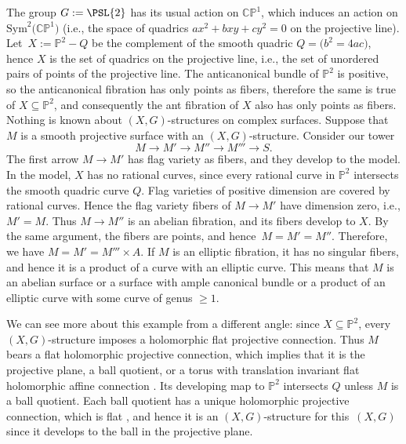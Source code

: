 \documentclass[10pt,a4paper]{amsart}
\providecommand{\Proj}{}
\numberwithin{equation}{section}
\renewcommand{\Proj}[1]{{\mathbb{P}^{#1}}}
\begin{document}
\begin{Example}
The group $G := \PSL{2}$ has its usual action on ${\mathbb C}{\mathbb P}^1$, which induces an action on $\text{Sym}^2\big({\mathbb C}{\mathbb P}^1\big)$
(i.e., the space of quadrics $ax^2+bxy+cy^2 = 0$ on the projective line).
Let~${X := \Proj{2}-Q}$ be the complement of the smooth quadric $Q = \big(b^2 = 4ac\big)$, hence $X$ is the set of quadrics on the projective line, i.e., the set of unordered pairs of points of the projective line.
The anticanonical bundle of $\Proj{2}$ is positive, so the anticanonical fibration has only points as fibers, therefore the same is
true of $X \subseteq \Proj{2}$, and consequently the ant fibration of $X$ also has only points as fibers.
Nothing is known about $(X, G)$-structures on complex surfaces.
Suppose that $M$ is a smooth projective surface with an $(X, G)$-structure.
Consider our tower
\[M \longrightarrow M' \longrightarrow M'' \longrightarrow M''' \longrightarrow S.\]
The first arrow $M \to M'$ has flag variety as fibers, and they develop to the model.
In the model, $X$ has no rational curves, since every rational curve in $\Proj{2}$ intersects the smooth quadric curve $Q$.
Flag varieties of positive dimension are covered by rational curves.
Hence the flag variety fibers of $M \to M'$ have dimension zero, i.e., $M' = M$.
Thus $M \to M''$ is an abelian fibration, and its fibers develop to $X$.
By the same argument, the fibers are points, and hence~${M = M' = M''}$.
Therefore, we have $M = M' = M'''\times A$.
If $M$ is an elliptic fibration, it has no singular fibers, and hence it is a product of a curve with an elliptic curve.
This means that $M$ is an abelian surface or a surface with ample canonical bundle or a product of an elliptic curve with some curve of
genus $ \ge 1$.

We can see more about this example from a different angle: since $X \subseteq \Proj{2}$, every $(X, G)$-structure imposes a
holomorphic flat projective connection. Thus $M$ bears a flat holomorphic projective connection, which
implies that it is the projective plane, a ball
quotient, or a torus with translation invariant flat holomorphic affine connection \cite[Main theorem]{KobayashiOchiai:1980}. Its
developing map to $\Proj{2}$ intersects $Q$ unless $M$ is a ball quotient. Each ball quotient has a unique holomorphic projective
connection, which is flat \cite{McKay:2016}, and hence it is an $(X, G)$-structure for this~$(X, G)$ since it develops to the ball in the
projective plane.
\end{Example}
\end{document}
